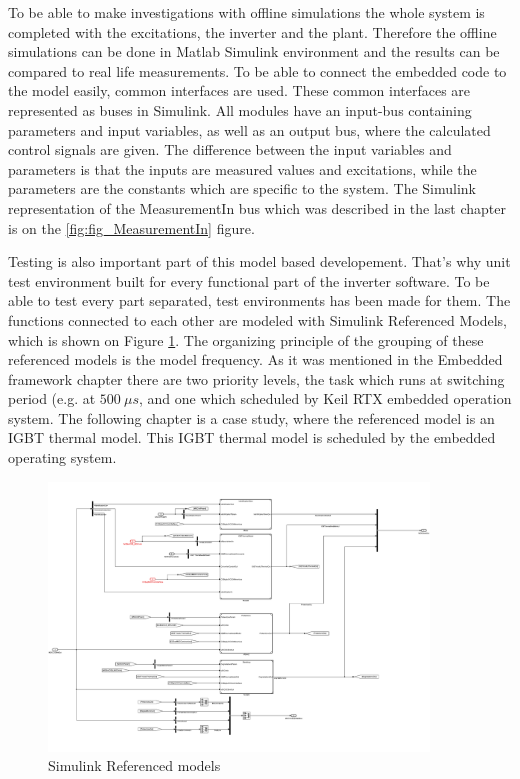 To be able to make investigations with offline simulations the whole system is completed with the excitations, the inverter and the plant. Therefore the offline simulations can be done in Matlab Simulink environment and the results can be compared to real life measurements. To be able to connect the embedded code to the model easily, common interfaces are used. These common interfaces are represented as buses in Simulink. All modules have an input-bus containing parameters and input variables, as well as an output bus, where the calculated control signals are given. The difference between the input variables and parameters is that the inputs are measured values and excitations, while the parameters are the constants which are specific to the system. The Simulink representation of the MeasurementIn bus which was described in the last chapter is on the \ref{fig:fig_MeasurementIn} figure.

Testing is also important part of this model based developement. That's why unit test environment built for every functional part of the inverter software. To be able to test every part separated, test environments has been made for them. The functions connected to each other are modeled with Simulink Referenced Models, which is shown on Figure \ref{fig:ref_model}. The organizing principle of the grouping of these referenced models is the model frequency. As it was mentioned in the Embedded framework chapter there are two priority levels, the task which runs at switching period (e.g. at $500\ \mu{}s$, and one which scheduled by Keil RTX embedded operation system. The following chapter is a case study, where the referenced model is an IGBT thermal model. This IGBT thermal model is scheduled by the embedded operating system. 

\begin{figure}[!h]
\centering
\includegraphics[width=0.9\textwidth]{figures/referenceModels.pdf}

\caption{Simulink Referenced models}
\label{fig:ref_model}
\end{figure}

